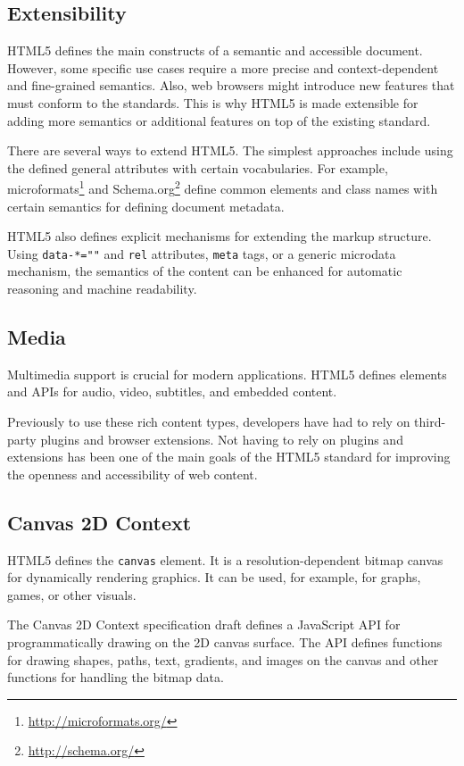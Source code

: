 \subsection{Extensibility}

HTML5 defines the main constructs of a semantic and accessible
document. However, some specific use cases require a more precise and
context-dependent and fine-grained semantics. Also, web browsers might
introduce new features that must conform to the standards. This is why
HTML5 is made extensible for adding more semantics or additional
features on top of the existing standard.

There are several ways to extend HTML5. The simplest approaches
include using the defined general attributes with certain
vocabularies. For example,
microformats\footnote{\url{http://microformats.org/}} and
Schema.org\footnote{\url{http://schema.org/}} define common elements
and class names with certain semantics for defining document metadata.

HTML5 also defines explicit mechanisms for extending the markup
structure. Using \texttt{data-*=""} and \texttt{rel} attributes,
\texttt{meta} tags, or a generic microdata mechanism, the semantics of
the content can be enhanced for automatic reasoning and machine
readability. \cite{HTML5draft}

\subsection{Media}

Multimedia support is crucial for modern applications. HTML5 defines
elements and APIs for audio, video, subtitles, and embedded content.

Previously to use these rich content types, developers have had to
rely on third-party plugins and browser extensions. Not having to rely
on plugins and extensions has been one of the main goals of the HTML5
standard for improving the openness and accessibility of web content.

\subsection{Canvas 2D Context}

HTML5 defines the \texttt{canvas} element. It is a
resolution-dependent bitmap canvas for dynamically rendering
graphics. It can be used, for example, for graphs, games, or other
visuals. \cite{HTML5draft}

The Canvas 2D Context specification draft \cite{canvas2Ddraft} defines
a JavaScript API for programmatically drawing on the 2D canvas
surface. The API defines functions for drawing shapes, paths, text,
gradients, and images on the canvas and other functions for handling
the bitmap data.

